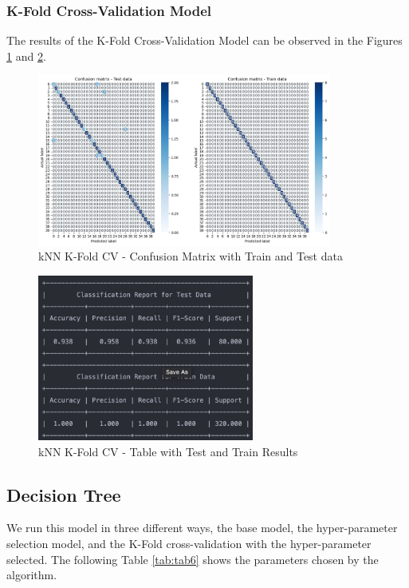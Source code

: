 \documentclass[conference]{IEEEtran}
\begin{document}
\subsubsection{K-Fold Cross-Validation Model}
The results of the K-Fold Cross-Validation Model can be observed in the Figures \ref{fig:conf_knn_3} and \ref{fig:conf_knn_r_3}.

\begin{figure}[H]
    \centering
    \includegraphics[width=3.8in]{k-NN/3.png}%
    \caption{kNN K-Fold CV - Confusion Matrix with Train and Test data}%
    \label{fig:conf_knn_3}%
\end{figure}

\begin{figure}[H]
    \centering
    \includegraphics[width=2.8in]{k-NN/r_3.png}%
    \caption{kNN K-Fold CV - Table with Test and Train Results}%
    \label{fig:conf_knn_r_3}%
\end{figure}


\subsection{Decision Tree}
We run this model in three different ways, the base model, the hyper-parameter selection model, and the K-Fold cross-validation with the hyper-parameter selected. The following Table \ref{tab:tab6} shows the parameters chosen by the algorithm.
\end{document}
